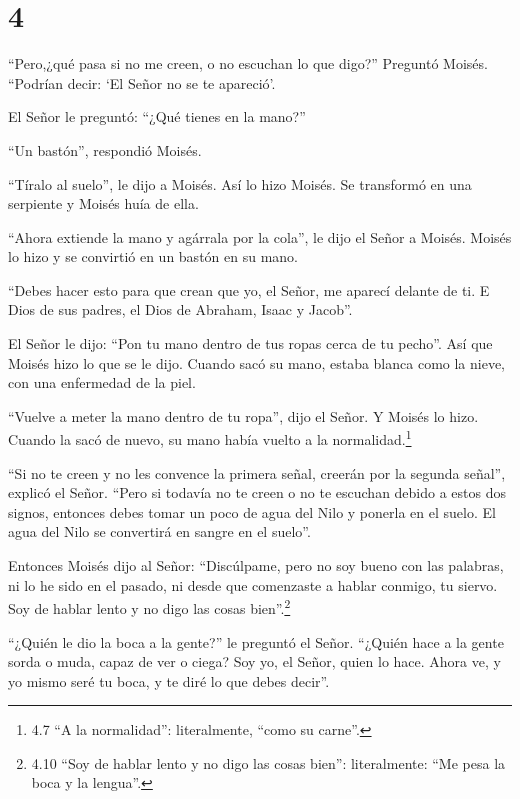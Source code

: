\hypertarget{section-3}{%
\section{4}\label{section-3}}

 ``Pero,¿qué pasa si no me creen, o no escuchan lo que
digo?'' Preguntó Moisés. ``Podrían decir: `El Señor no se te apareció'.

 El Señor le preguntó: ``¿Qué tienes en la mano?''

``Un bastón'', respondió Moisés.

 ``Tíralo al suelo'', le dijo a Moisés. Así lo hizo Moisés.
Se transformó en una serpiente y Moisés huía de ella.

 ``Ahora extiende la mano y agárrala por la cola'', le dijo
el Señor a Moisés. Moisés lo hizo y se convirtió en un bastón en su
mano.

 ``Debes hacer esto para que crean que yo, el Señor, me
aparecí delante de ti. E Dios de sus padres, el Dios de Abraham, Isaac y
Jacob''.

 El Señor le dijo: ``Pon tu mano dentro de tus ropas cerca
de tu pecho''. Así que Moisés hizo lo que se le dijo. Cuando sacó su
mano, estaba blanca como la nieve, con una enfermedad de la piel.

 ``Vuelve a meter la mano dentro de tu ropa'', dijo el
Señor. Y Moisés lo hizo. Cuando la sacó de nuevo, su mano había vuelto a
la normalidad.\footnote{4.7 ``A la normalidad'': literalmente, ``como su
  carne''.}

 ``Si no te creen y no les convence la primera señal,
creerán por la segunda señal'', explicó el Señor.  ``Pero si
todavía no te creen o no te escuchan debido a estos dos signos, entonces
debes tomar un poco de agua del Nilo y ponerla en el suelo. El agua del
Nilo se convertirá en sangre en el suelo''.

 Entonces Moisés dijo al Señor: ``Discúlpame, pero no soy
bueno con las palabras, ni lo he sido en el pasado, ni desde que
comenzaste a hablar conmigo, tu siervo. Soy de hablar lento y no digo
las cosas bien''.\footnote{4.10 ``Soy de hablar lento y no digo las
  cosas bien'': literalmente: ``Me pesa la boca y la lengua''.}

 ``¿Quién le dio la boca a la gente?'' le preguntó el
Señor. ``¿Quién hace a la gente sorda o muda, capaz de ver o ciega? Soy
yo, el Señor, quien lo hace.  Ahora ve, y yo mismo seré tu
boca, y te diré lo que debes decir''.

